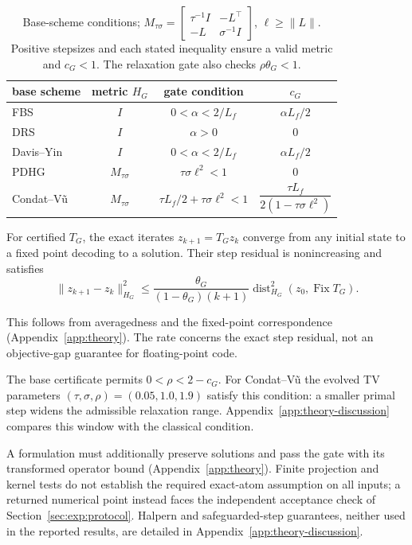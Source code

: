 \begin{table}[H]
\centering\small
\begin{tabular}{lccc}
\toprule
base scheme & metric $H_G$ & gate condition & $c_G$ \\
\midrule
FBS & $I$ & $0<\alpha<2/L_f$ & $\alpha L_f/2$ \\
DRS & $I$ & $\alpha>0$ & $0$ \\
Davis--Yin & $I$ & $0<\alpha<2/L_f$ & $\alpha L_f/2$ \\
PDHG & $M_{\tau\sigma}$ & $\tau\sigma\ell^2<1$ & $0$ \\
Condat--V\~u & $M_{\tau\sigma}$ & $\tau L_f/2+\tau\sigma\ell^2<1$ & $\dfrac{\tau L_f}{2(1-\tau\sigma\ell^2)}$ \\
\bottomrule
\end{tabular}
\caption{Base-scheme conditions; $M_{\tau\sigma}=[\begin{smallmatrix}\tau^{-1}I&-L^{\!\top}\\-L&\sigma^{-1}I\end{smallmatrix}]$, $\ell\ge\|L\|$. Positive stepsizes and each stated inequality ensure a valid metric and $c_G<1$. The relaxation gate also checks $\rho\theta_G<1$.}
\label{tab:certificates}
\end{table}

\begin{corollary}
\label{cor:convergence}
For certified $T_G$, the exact iterates $z_{k+1}=T_Gz_k$ converge from any initial state to a fixed point decoding to a solution. Their step residual is nonincreasing and satisfies
\begin{equation}
\|z_{k+1}-z_k\|_{H_G}^2\le
\frac{\theta_G}{(1-\theta_G)(k+1)}
\operatorname{dist}_{H_G}^2(z_0,\operatorname{Fix}T_G).
\label{eq:residual-rate}
\end{equation}
\end{corollary}
This follows from averagedness and the fixed-point correspondence (Appendix~\ref{app:theory}). The rate concerns the exact step residual, not an objective-gap guarantee for floating-point code.

\begin{remark}
\label{rem:relaxation-window}
The base certificate permits $0<\rho<2-c_G$. For Condat--V\~u the evolved TV parameters $(\tau,\sigma,\rho)=(0.05,1.0,1.9)$ satisfy this condition: a smaller primal step widens the admissible relaxation range. Appendix~\ref{app:theory-discussion} compares this window with the classical condition.
\end{remark}

A formulation must additionally preserve solutions and pass the gate with its transformed operator bound (Appendix~\ref{app:theory}). Finite projection and kernel tests do not establish the required exact-atom assumption on all inputs; a returned numerical point instead faces the independent acceptance check of Section~\ref{sec:exp:protocol}. Halpern and safeguarded-step guarantees, neither used in the reported results, are detailed in Appendix~\ref{app:theory-discussion}.

